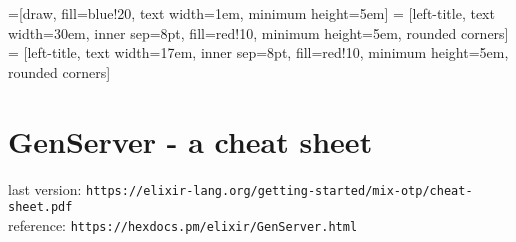 \documentclass[a4paper]{article}
\def\parchmentframe#1{
\tikz{
  \node[inner sep=2em] (A) {#1};  %
  \begin{pgfonlayer}{background}  %
  \filldraw[normal border,rounded corners=2em,color=blue!10!yellow!5,draw=blue!25!yellow,dashed]
        (A.south east) -- (A.south west) --
        (A.north west) -- (A.north east) -- cycle;
  \end{pgfonlayer}}}
\def\parchmentframetop#1{
\tikz{
  \node[inner sep=2em] (A) {#1};    %
  \begin{pgfonlayer}{background}
  \filldraw[normal border,rounded corners,color=blue!10!yellow!5,draw=blue!25!yellow,dashed]
        (A.south east) -- (A.south west) --
        (A.north west) -- (A.north east) -- cycle;
  \end{pgfonlayer}}}
\def\parchmentframebottom#1{
\tikz{
  \node[inner sep=2em] (A) {#1};   %
  \begin{pgfonlayer}{background}
  \filldraw[normal border,rounded corners,color=blue!10!yellow!5,draw=blue!25!yellow,dashed]
        (A.south east) -- (A.south west) --
        (A.north west) -- (A.north east) -- cycle;
  \end{pgfonlayer}}}
\def\parchmentframemiddle#1{
\tikz{
  \node[inner sep=2em] (A) {#1};   %
  \begin{pgfonlayer}{background}
  \filldraw[normal border,rounded corners,color=blue!10!yellow!5,draw=blue!25!yellow,dashed]
        (A.south east) -- (A.south west) --
        (A.north west) -- (A.north east) -- cycle;
  \end{pgfonlayer}}}
\newenvironment{parchment}[1][Example]{%
  \def\FrameCommand{\parchmentframe}%
  \def\FirstFrameCommand{\parchmentframetop}%
  \def\LastFrameCommand{\parchmentframebottom}%
  \def\MidFrameCommand{\parchmentframemiddle}%
  \vskip\baselineskip
  \MakeFramed {\FrameRestore}
  \noindent\tikz\node[rounded corners=2ex, inner sep=2ex, draw=blue!25!yellow, fill=white, dashed, anchor=west, overlay] at (0em, 2em) {\sffamily#1};\par}%
{\endMakeFramed}
\begin{document}

=[draw, fill=blue!20, text width=1em, minimum height=5em]
 = [left-title, text width=30em, inner sep=8pt, fill=red!10, minimum height=5em, rounded corners]
 = [left-title, text width=17em, inner sep=8pt, fill=red!10, minimum height=5em, rounded corners]

\begin{comment}
\begin{parchment}[commentarii de bello gallico]
  Gallia est omnis divisa in partes tres, quarum unam incolunt Belgae, aliam Aquitani, tertiam qui ipsorum lingua Celtae, nostra Galli appellantur. Hi omnes lingua, institutis, legibus inter se differunt. Gallos ab Aquitanis Garumna flumen, a Belgis Matrona et Sequana dividit. Horum omnium fortissimi sunt Belgae, propterea quod a cultu atque humanitate provinciae longissime absunt, minimeque ad eos mercatores saepe commeant atque ea quae ad effeminandos animos pertinent important, proximique sunt Germanis, qui trans Rhenum incolunt, quibuscum continenter bellum gerunt. Qua de causa Helvetii quoque reliquos Gallos virtute praecedunt, quod fere cotidianis proeliis cum Germanis contendunt, cum aut suis finibus eos prohibent aut ipsi in eorum finibus bellum gerunt. Eorum una pars, quam Gallos obtinere dictum est, initium capit a flumine Rhodano, continetur Garumna flumine, Oceano, finibus Belgarum, attingit etiam ab Sequanis et Helvetiis flumen Rhenum, vergit ad septentriones. Belgae ab extremis Galliae finibus oriuntur, pertinent ad inferiorem partem fluminis Rheni, spectant in septentrionem et orientem solem. Aquitania a Garumna flumine ad Pyrenaeos montes et eam partem Oceani quae est ad Hispaniam pertinet; spectat inter occasum solis et septentriones.
\end{parchment}
\end{comment}
\section*{GenServer - a cheat sheet}
last version: \verb|https://elixir-lang.org/getting-started/mix-otp/cheat-sheet.pdf|\\
reference: \verb|https://hexdocs.pm/elixir/GenServer.html|
\end{document}
